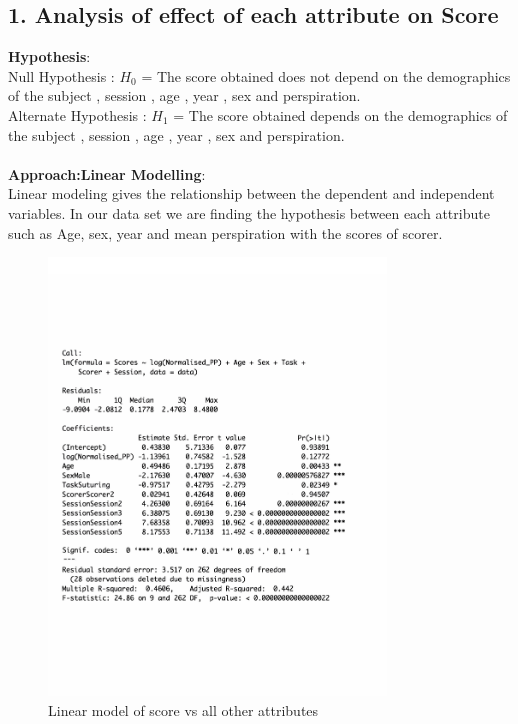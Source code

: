 \documentclass[12pt,epsf]{report}
\begin{document}
{\subsection*{1. Analysis of effect of each attribute on Score}
\textbf{Hypothesis}:\\
Null Hypothesis : $H_0$ =  The score obtained does not depend on the demographics of the subject , session , age , year , sex and perspiration.\\
Alternate Hypothesis : $H_1$ =  The score obtained  depends on the demographics of the subject , session , age , year , sex and perspiration.\\
\\
\textbf{Approach:Linear Modelling}:\\
Linear modeling gives the relationship between the dependent and independent variables. 
In our data set we are finding the hypothesis between each attribute such as Age, sex, year and mean perspiration with the scores of scorer.\\
\begin{figure}[!htb]
	\centering
	\includegraphics[width=0.8\textwidth]{ScoreSummary.pdf}
	\caption{Linear model of score vs all other attributes}
	\centering
\end{figure}
}
\end{document}
